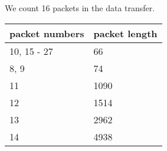 
We count 16 packets in the data transfer.


\begin{center}
\begin{tabular}{| l | l |}
    \hline
    packet numbers & packet length \\ \hline
    10, 15 - 27 & 66 \\ \hline
    8, 9 & 74 \\ \hline
    11 & 1090 \\ \hline
    12 & 1514 \\ \hline
    13 & 2962 \\ \hline
    14 & 4938 \\ \hline
\end{tabular}
\end{center}
